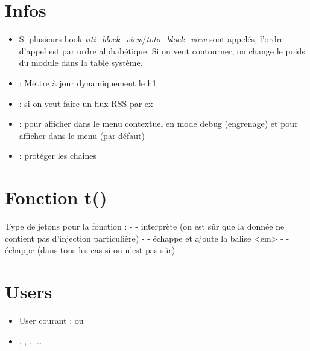 \documentclass[a4paper,11pt,french]{rtdsphinxmanual}
\begin{document}
\section{Infos}
\label{theming:infos}\begin{itemize}
\item {} 
Si plusieurs hook \emph{titi\_block\_view}/\emph{toto\_block\_view} sont appelés, l'ordre d'appel est par ordre alphabétique. Si on veut contourner, on change le poids du module dans la table système.

\item {} 
 : Mettre à jour dynamiquement le h1

\item {} 
 : si on veut faire un flux RSS par ex

\item {} 
 :  pour afficher dans le menu contextuel en mode debug (engrenage) et  pour afficher dans le menu (par défaut)

\item {} 
 : protéger les chaines

\end{itemize}


\section{Fonction t()}
\label{theming:fonction-t}
Type de jetons pour la fonction  :
- \code{!} - interprète (on est sûr que la donnée ne contient pas d'injection particulière)
- \code{\%} - échappe et ajoute la balise \textless{}em\textgreater{}
-  - échappe (dans tous les cas si on n'est pas sûr)


\section{Users}
\label{theming:users}\begin{itemize}
\item {} 
User courant :  ou 

\item {} 
, , , ...

\end{itemize}
\end{document}
